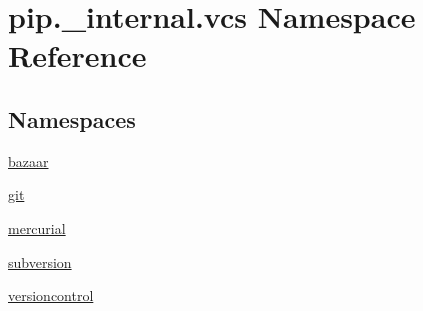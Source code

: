 \hypertarget{namespacepip_1_1__internal_1_1vcs}{}\section{pip.\+\_\+internal.\+vcs Namespace Reference}
\label{namespacepip_1_1__internal_1_1vcs}
\subsection*{Namespaces}
\begin{DoxyCompactItemize}
\item 
 \hyperlink{namespacepip_1_1__internal_1_1vcs_1_1bazaar}{bazaar}
\item 
 \hyperlink{namespacepip_1_1__internal_1_1vcs_1_1git}{git}
\item 
 \hyperlink{namespacepip_1_1__internal_1_1vcs_1_1mercurial}{mercurial}
\item 
 \hyperlink{namespacepip_1_1__internal_1_1vcs_1_1subversion}{subversion}
\item 
 \hyperlink{namespacepip_1_1__internal_1_1vcs_1_1versioncontrol}{versioncontrol}
\end{DoxyCompactItemize}
